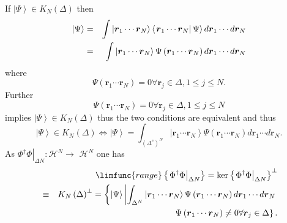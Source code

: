 \documentclass[12pt]{article}
\begin{document}
If $\left\vert \Psi \right\rangle \in K_{N}\left( \Delta \right) $ then 
\begin{eqnarray}
\left\vert \Psi \right\rangle  &=&\int \left\vert \boldsymbol{r}_{1}\cdots 
\boldsymbol{r}_{N}\right\rangle \left\langle \left. \boldsymbol{r}_{1}\cdots 
\boldsymbol{r}_{N}\right\vert \Psi \right\rangle d\boldsymbol{r}_{1}\cdots d%
\boldsymbol{r}_{N}  \notag \\
&=&\int \left\vert \boldsymbol{r}_{1}\cdots \boldsymbol{r}_{N}\right\rangle
\Psi \left( \boldsymbol{r}_{1}\cdots \boldsymbol{r}_{N}\right) d\boldsymbol{r%
}_{1}\cdots d\boldsymbol{r}_{N}
\end{eqnarray}%
where 
\begin{equation}
\Psi \left( \boldsymbol{r}_{1}\cdots \boldsymbol{r}_{N}\right) =0\forall 
\boldsymbol{r}_{j}\in \Delta ,1\leq j\leq N.
\end{equation}%
Further 
\begin{equation}
\Psi \left( \boldsymbol{r}_{1}\cdots \boldsymbol{r}_{N}\right) =0\forall 
\boldsymbol{r}_{j}\in \Delta ,1\leq j\leq N
\end{equation}%
implies $\left\vert \Psi \right\rangle \in K_{N}\left( \Delta \right) $ thus
the two conditions are equivalent and thus  
\begin{equation}
\left\vert \Psi \right\rangle \in K_{N}\left( \Delta \right) \Leftrightarrow
\left\vert \Psi \right\rangle =\int_{\left( \Delta ^{c}\right)
^{N}}\left\vert \boldsymbol{r}_{1}\cdots \boldsymbol{r}_{N}\right\rangle
\Psi \left( \boldsymbol{r}_{1}\cdots \boldsymbol{r}_{N}\right) d\boldsymbol{r%
}_{1}\cdots d\boldsymbol{r}_{N}.
\end{equation}%
As $\left. \Phi ^{\dagger }\Phi \right\vert _{\Delta N}:\mathcal{H}%
^{N}\rightarrow $ $\mathcal{H}^{N}$ one has%
\begin{eqnarray}
&&\limfunc{range}\left\{ \left. \Phi ^{\dagger }\Phi \right\vert _{\Delta
N}\right\} =\ker \left\{ \left. \Phi ^{\dagger }\Phi \right\vert _{\Delta
N}\right\} ^{\bot }  \notag \\
&\equiv &K_{N}\left( \Delta \right) ^{\bot }=\left\{ \left\vert \Psi
\right\rangle \left\vert \int_{\Delta ^{N}}\left\vert \boldsymbol{r}%
_{1}\cdots \boldsymbol{r}_{N}\right\rangle \Psi \left( \boldsymbol{r}%
_{1}\cdots \boldsymbol{r}_{N}\right) d\boldsymbol{r}_{1}\cdots d\boldsymbol{r%
}_{N}\right. \right.   \notag \\
&&\qquad \qquad \qquad \qquad \qquad \qquad \left. \Psi \left( \boldsymbol{r}%
_{1}\cdots \boldsymbol{r}_{N}\right) \neq 0\forall \boldsymbol{r}_{j}\in
\Delta \right\} .
\end{eqnarray}%
\end{document}
